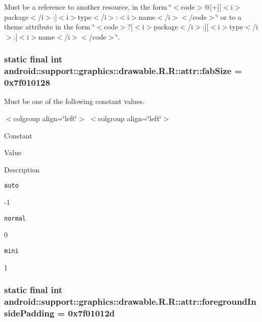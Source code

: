 Must be a reference to another resource, in the form \char`\"{}$<$code$>$@\mbox{[}+\mbox{]}\mbox{[}$<$i$>$package$<$/i$>$:\mbox{]}$<$i$>$type$<$/i$>$:$<$i$>$name$<$/i$>$$<$/code$>$\char`\"{} or to a theme attribute in the form \char`\"{}$<$code$>$?\mbox{[}$<$i$>$package$<$/i$>$:\mbox{]}\mbox{[}$<$i$>$type$<$/i$>$:\mbox{]}$<$i$>$name$<$/i$>$$<$/code$>$\char`\"{}. \hypertarget{classandroid_1_1support_1_1graphics_1_1drawable_1_1_r_1_1attr_adfec0f656aeb7c0b981927269896dfb}{
\subsubsection[{fabSize}]{\setlength{\rightskip}{0pt plus 5cm}static final int android::support::graphics::drawable.R.R::attr::fabSize = 0x7f010128}}
\label{classandroid_1_1support_1_1graphics_1_1drawable_1_1_r_1_1attr_adfec0f656aeb7c0b981927269896dfb}


Must be one of the following constant values. \begin{TabularC}{0}
\hline
\end{TabularC}
$<$colgroup align=\char`\"{}left\char`\"{}$>$ $<$colgroup align=\char`\"{}left\char`\"{}$>$ 

Constant

Value

Description 

{\tt auto}

-1

{\tt normal}

0

{\tt mini}

1\hypertarget{classandroid_1_1support_1_1graphics_1_1drawable_1_1_r_1_1attr_cb3465d177569910532d43b75eb6632c}{
\subsubsection[{foregroundInsidePadding}]{\setlength{\rightskip}{0pt plus 5cm}static final int android::support::graphics::drawable.R.R::attr::foregroundInsidePadding = 0x7f01012d}}
\label{classandroid_1_1support_1_1graphics_1_1drawable_1_1_r_1_1attr_cb3465d177569910532d43b75eb6632c}


